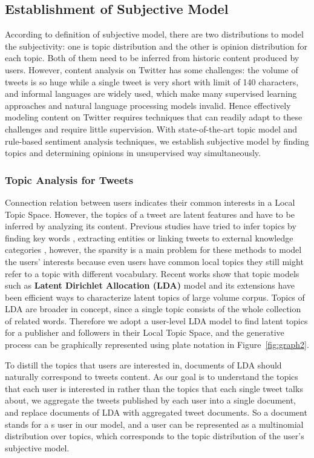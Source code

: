 \documentclass{acm_proc_article-sp}
\begin{document}
\subsection{Establishment of Subjective Model}
\label{concrete}
According to definition of subjective model, there are two distributions to model the subjectivity: one is topic distribution and the other is opinion distribution for each topic. Both of them need to be inferred from historic content produced by users.
However, content analysis on Twitter has some challenges: the volume of tweets is so huge while a single tweet is very short with limit of 140 characters, and informal languages are widely used, which make many supervised learning approaches and natural language processing models invalid. 
Hence effectively modeling content on Twitter requires techniques that can readily adapt to these challenges and require little supervision.
With state-of-the-art topic model and rule-based sentiment analysis techniques, we establish subjective model by finding topics and determining opinions in unsupervised way simultaneously. 
\subsubsection{Topic Analysis for Tweets}
\label{local}
Connection relation between users indicates their common interests in a Local Topic Space. 
However, the topics of a tweet are latent features and have to be inferred by analyzing its content.
Previous studies have tried to infer topics by finding key words \cite{Chen:2010STE}, extracting  entities \cite{Abel:2011AUM} or linking tweets to external knowledge categories \cite{conf/icwsm/MacskassyM11}, however, the sparsity is a main problem for these methods to model the users' interests because even users have common local topics they still might refer to a topic with different vocabulary.
Recent works show that topic models such as \textbf{Latent Dirichlet Allocation (LDA)} model and its extensions\cite{blei2003latent,conf/wsdm/WengLJH10} have been efficient ways to characterize latent topics of large volume corpus.  
Topics of LDA are broader in concept, since a single topic consists of the whole collection of related words. 
Therefore we adopt a user-level LDA model to find latent topics for a publisher and followers in their Local Topic Space, and the generative process can be graphically represented using plate notation in Figure~\ref{fig:graph2}.

To distill the topics that users are interested in, documents of LDA should naturally correspond to tweets content. 
As our goal is to understand the topics that each user is interested in rather than the topics that each single tweet talks about, we aggregate the tweets published by each user into a single document, and replace documents of LDA with aggregated tweet documents. 
So a document stands for a s user in our model, and a user can be represented as a multinomial distribution over topics, which corresponds to the topic distribution of the user's subjective model.
 
\end{document}
